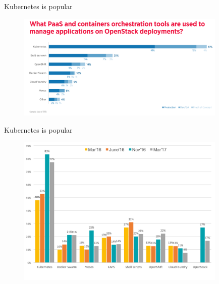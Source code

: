 \documentclass{beamer}
\begin{document}
\begin{frame}{Kubernetes is popular}%
\begin{figure}
	\includegraphics[width=10cm]{figures/k8s-openstack-survey.png}
	\label{fig:k8s-openstack-survey}
\end{figure}
\end{frame}

\begin{frame}{Kubernetes is popular}%
\begin{figure}
	\includegraphics[width=10cm]{figures/cncf-container-orchestrators.png}
	\label{fig:cncf-container-orchestrators}
\end{figure}
\end{frame}
\end{document}
